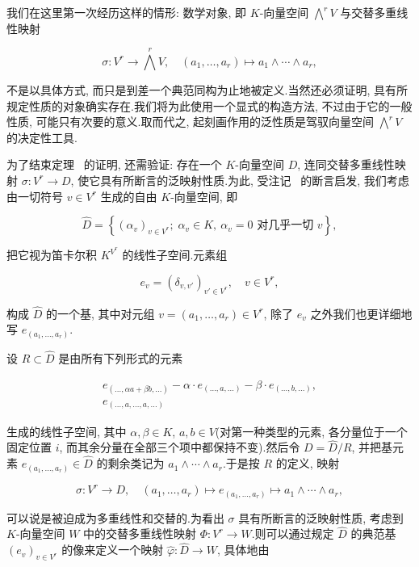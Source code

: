 我们在这里第一次经历这样的情形: 数学对象, 即 $K$-向量空间 $\bigwedge^r V$ 与交替多重线性映射

\[
\sigma \colon V^r \longrightarrow \bigwedge^r V, \quad (a_1, \ldots, a_r) \longmapsto a_1 \wedge \cdots \wedge a_r,
\]

不是以具体方式, 而只是到差一个典范同构为止地被定义.当然还必须证明, 具有所规定性质的对象确实存在.我们将为此使用一个显式的构造方法, 不过由于它的一般性质, 可能只有次要的意义.取而代之, 起刻画作用的泛性质是驾驭向量空间 $\bigwedge^r V$ 的决定性工具.

为了结束定理~ 的证明, 还需验证: 存在一个 $K$-向量空间 $D$, 连同交替多重线性映射 $\sigma \colon V^r \longrightarrow D$, 使它具有所断言的泛映射性质.为此, 受注记~ 的断言启发, 我们考虑由一切符号 $v \in V^r$ 生成的自由 $K$-向量空间, 即

\[
\hat{D} = \left\{(\alpha_v)_{v \in V^r};\; \alpha_v \in K, \ \alpha_v = 0 \text{ 对几乎一切 } v \right\},
\]

把它视为笛卡尔积 $K^{V^r}$ 的线性子空间.元素组

\[
e_v = \left(\delta_{v, v'}\right)_{v' \in V^r}, \quad v \in V^r,
\]

构成 $\hat{D}$ 的一个基, 其中对元组 $v = (a_1, \ldots, a_r) \in V^r$, 除了 $e_v$ 之外我们也更详细地写 $e_{(a_1, \ldots, a_r)}$.

设 $R \subset \hat{D}$ 是由所有下列形式的元素

\[
\begin{array}{c}
e_{(\ldots, \alpha a + \beta b, \ldots)} - \alpha \cdot e_{(\ldots, a, \ldots)} - \beta \cdot e_{(\ldots, b, \ldots)}, \\
e_{(\ldots, a, \ldots, a, \ldots)}
\end{array}
\]

生成的线性子空间, 其中 $\alpha, \beta \in K$, $a, b \in V$(对第一种类型的元素, 各分量位于一个固定位置 $i$, 而其余分量在全部三个项中都保持不变).然后令 $D = \hat{D} / R$, 并把基元素 $e_{(a_1, \ldots, a_r)} \in \hat{D}$ 的剩余类记为 $a_1 \wedge \cdots \wedge a_r$.于是按 $R$ 的定义, 映射

\[
\sigma \colon V^r \longrightarrow D, \quad (a_1, \ldots, a_r) \longmapsto e_{(a_1, \ldots, a_r)} \longmapsto a_1 \wedge \cdots \wedge a_r,
\]

可以说是被迫成为多重线性和交替的.为看出 $\sigma$ 具有所断言的泛映射性质, 考虑到 $K$-向量空间 $W$ 中的交替多重线性映射 $\Phi \colon V^r \longrightarrow W$.则可以通过规定 $\hat{D}$ 的典范基 $(e_v)_{v \in V^r}$ 的像来定义一个映射 $\hat{\varphi} \colon \hat{D} \longrightarrow W$, 具体地由

